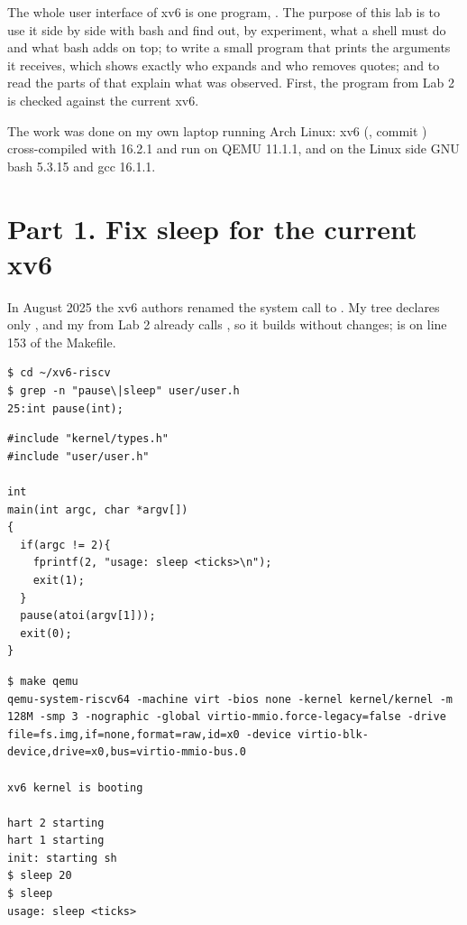 \documentclass[11pt,a4paper]{article}
\begin{document}
\utmtitlepage
\tableofcontents
\newpage


The whole user interface of xv6 is one program, . The purpose of this lab is to
use it side by side with bash and find out, by experiment, what a shell must do and what bash
adds on top; to write a small program that prints the arguments it receives, which shows
exactly who expands \code{*} and who removes quotes; and to read the parts of  that
explain what was observed. First, the  program from Lab 2 is checked against the
current xv6.

The work was done on my own laptop running Arch Linux: xv6 (, commit
) cross-compiled with  16.2.1 and run on QEMU
11.1.1, and on the Linux side GNU bash 5.3.15 and gcc 16.1.1.

\section{Part 1. Fix sleep for the current xv6}

In August 2025 the xv6 authors renamed the system call  to . My
tree declares only , and my  from Lab 2 already calls ,
so it builds without changes;  is on line 153 of the Makefile.

\begin{lstlisting}[caption={The grep result in user.h}]
$ cd ~/xv6-riscv
$ grep -n "pause\|sleep" user/user.h
25:int pause(int);
\end{lstlisting}

\begin{lstlisting}[style=ccode,caption={The updated sleep.c}]
#include "kernel/types.h"
#include "user/user.h"

int
main(int argc, char *argv[])
{
  if(argc != 2){
    fprintf(2, "usage: sleep <ticks>\n");
    exit(1);
  }
  pause(atoi(argv[1]));
  exit(0);
}
\end{lstlisting}

\begin{lstlisting}[caption={sleep running in xv6, with and without an argument}]
$ make qemu
qemu-system-riscv64 -machine virt -bios none -kernel kernel/kernel -m 128M -smp 3 -nographic -global virtio-mmio.force-legacy=false -drive file=fs.img,if=none,format=raw,id=x0 -device virtio-blk-device,drive=x0,bus=virtio-mmio-bus.0

xv6 kernel is booting

hart 2 starting
hart 1 starting
init: starting sh
$ sleep 20
$ sleep
usage: sleep <ticks>
\end{lstlisting}
\end{document}
